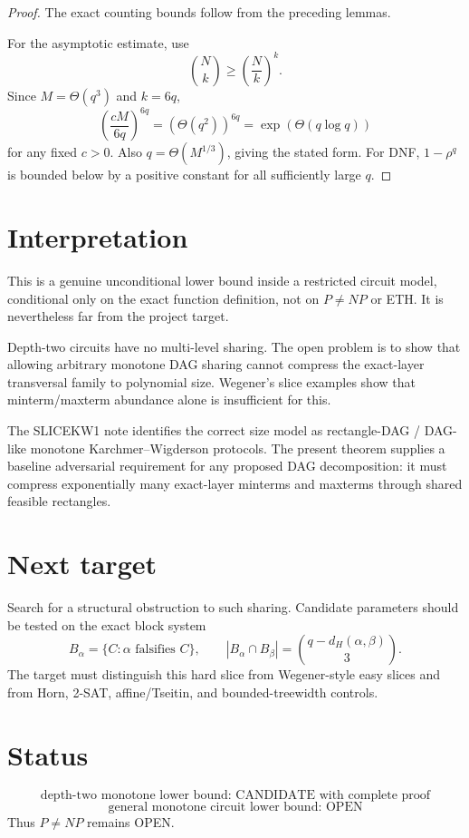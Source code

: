 \documentclass[11pt]{article}
\begin{document}
\begin{proof}
The exact counting bounds follow from the preceding lemmas.

For the asymptotic estimate, use
\[
\binom Nk\ge\left(\frac Nk\right)^k.
\]
Since \(M=\Theta(q^3)\) and \(k=6q\),
\[
\left(\frac{cM}{6q}\right)^{6q}
=
\left(\Theta(q^2)\right)^{6q}
=
\exp(\Theta(q\log q))
\]
for any fixed \(c>0\).  Also \(q=\Theta(M^{1/3})\), giving the stated form.
For DNF, \(1-\rho^q\) is bounded below by a positive constant for all
sufficiently large \(q\).
\end{proof}

\section{Interpretation}

This is a genuine unconditional lower bound inside a restricted circuit
model, conditional only on the exact function definition, not on \(P\ne NP\)
or ETH.  It is nevertheless far from the project target.

Depth-two circuits have no multi-level sharing.  The open problem is to show
that allowing arbitrary monotone DAG sharing cannot compress the exact-layer
transversal family to polynomial size.  Wegener's slice examples show that
minterm/maxterm abundance alone is insufficient for this.

The SLICEKW1 note identifies the correct size model as rectangle-DAG /
DAG-like monotone Karchmer--Wigderson protocols.  The present theorem supplies
a baseline adversarial requirement for any proposed DAG decomposition:
it must compress exponentially many exact-layer minterms and maxterms through
shared feasible rectangles.

\section{Next target}

Search for a structural obstruction to such sharing.  Candidate parameters
should be tested on the exact block system
\[
B_\alpha=\{C:\alpha\text{ falsifies }C\},
\qquad
|B_\alpha\cap B_\beta|
=
\binom{q-d_H(\alpha,\beta)}3.
\]
The target must distinguish this hard slice from Wegener-style easy slices
and from Horn, 2-SAT, affine/Tseitin, and bounded-treewidth controls.

\section{Status}

\[
\boxed{
\text{depth-two monotone lower bound: CANDIDATE with complete proof}
}
\]
\[
\boxed{
\text{general monotone circuit lower bound: OPEN}
}
\]
Thus \(P\ne NP\) remains OPEN.
\end{document}
